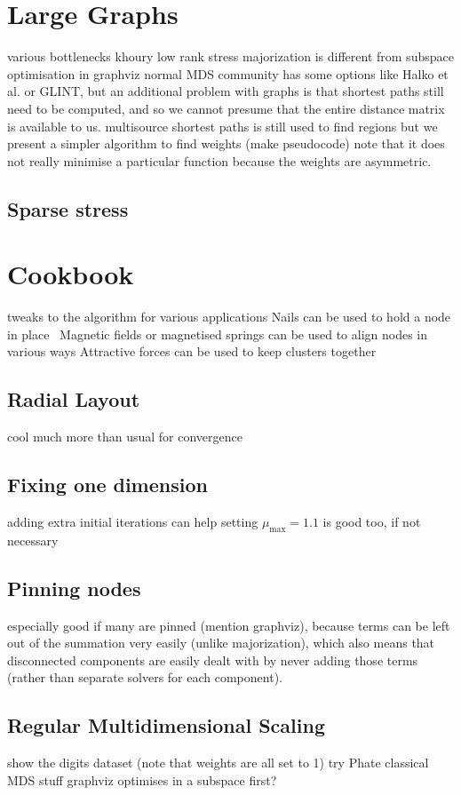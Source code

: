 \section{Large Graphs}
\label{sec:large_graphs}
various bottlenecks
khoury low rank stress majorization is different from subspace optimisation in graphviz
normal MDS community has some options like Halko et al. or GLINT, but an additional problem with graphs is that shortest paths still need to be computed, and so we cannot presume that the entire distance matrix is available to us.
multisource shortest paths is still used to find regions
but we present a simpler algorithm to find weights (make pseudocode)
note that it does not really minimise a particular function because the weights are asymmetric.

\subsection{Sparse stress}

\section{Cookbook}
tweaks to the algorithm for various applications
Nails can be used to hold a node in place~\cite{something}
Magnetic fields or magnetised springs can be used to align nodes in various ways
Attractive forces can be used to keep clusters together
\subsection{Radial Layout}
cool much more than usual for convergence
\subsection{Fixing one dimension}
adding extra initial iterations can help
setting $\mu_{\max}=1.1$ is good too, if not necessary
\subsection{Pinning nodes}
especially good if many are pinned (mention graphviz), because terms can be left out of the summation very easily (unlike majorization), which also means that disconnected components are easily dealt with by never adding those terms (rather than separate solvers for each component).
\subsection{Regular Multidimensional Scaling}
show the digits dataset (note that weights are all set to 1)
try Phate classical MDS stuff
graphviz optimises in a subspace first?